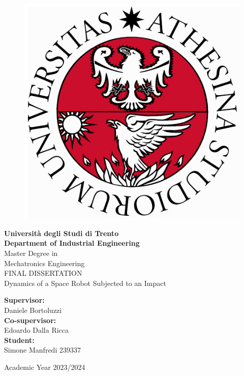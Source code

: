 \documentclass[a4paper,12pt,oneside]{report}
\begin{document}
\begin{titlepage}

\begin{figure}
\centering
\includegraphics[scale=0.25]{sigillo2}
\end{figure}

\begin{center}
\LARGE{\textbf{Università degli Studi di Trento\\ Department of Industrial Engineering}}\\
\vspace{10mm}
\Large{Master Degree in\\ Mechatronics Engineering}\\
\vspace{7mm}
\uppercase{Final Dissertation}
\vspace{7mm}\\
\huge{Dynamics of a Space Robot Subjected to an Impact}
\end{center}

\vspace{8mm}
\begin{flushleft}
\large{\textbf{Supervisor:}\\ Daniele Bortoluzzi}\\
\vspace{3mm}
\large{\textbf{Co-supervisor:}\\ Edoardo Dalla Ricca}\\
\vspace{3mm}
\large{\textbf{Student:}\\ Simone Manfredi 239337}\\
\end{flushleft}

\vspace{20mm}
\begin{center}
\Large{Academic Year 2023/2024}
\end{center}

\end{titlepage}
\end{document}

